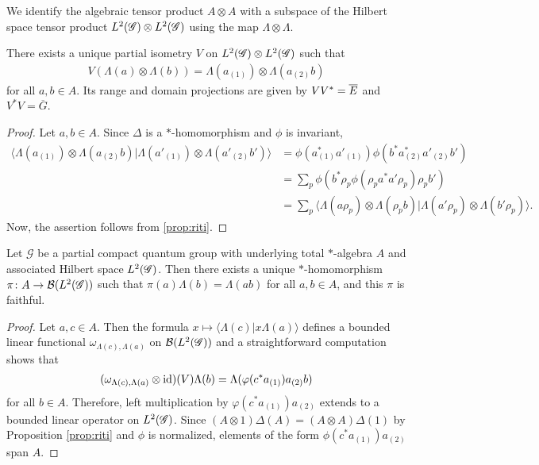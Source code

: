 We identify  the algebraic
tensor product $A\otimes A$ with a subspace of the Hilbert space
tensor product $L^{2}(\mathscr{G}) \otimes L^{2}(\mathscr{G})$ using the map $\Lambda \otimes \Lambda$.
\begin{Lem} \label{lemma:partial-isometry}
There exists a unique partial isometry $V$ on $L^{2}(\mathscr{G}) \otimes L^{2}(\mathscr{G})$
such that
\begin{align*}
  V(\Lambda(a) \otimes \Lambda(b)) = \Lambda(a_{(1)}) \otimes \Lambda(a_{(2)}b)
\end{align*}
for all $a,b\in A$. Its range and domain projections are given by $VV^{*} = \overline{E}$
and $V^{*}V = \overline{G}$.
\end{Lem}
\begin{proof}
  Let $a,b \in A$. Since $\Delta$ is a $*$-homomorphism and $\phi$ is
invariant,
  \begin{align*}
    \langle \Lambda(a_{(1)}) \otimes
    \Lambda(a_{(2)}b)|\Lambda(a'_{(1)}) \otimes
    \Lambda(a'_{(2)}b')\rangle &=
    \phi(a_{(1)}^{*}a'_{(1)})\phi(b^{*}a_{(2)}^{*}a'_{(2)}b') \\
    &= \sum_{p}
    \phi(b^{*}\rho_{p}\phi(\rho_{p}a^{*}a'\rho_{p})\rho_{p}b') \\
    & =\sum_{p} \langle\Lambda(a\rho_{p}) \otimes \Lambda(\rho_{p}b) |
    \Lambda(a'\rho_{p}) \otimes \Lambda(b'\rho_{p})\rangle.
  \end{align*}
  Now, the assertion follows from \ref{prop:riti}.
\end{proof}

\begin{Prop} \label{prop:gns} Let $\mathscr{G}$ be a partial compact quantum group with
  underlying total $*$-algebra $A$ and associated Hilbert
  space $L^{2}(\mathscr{G})$. Then there exists a unique $*$-homomorphism $\pi\colon
  A \to {\cal B}(L^{2}(\mathscr{G}))$ such that $\pi(a)\Lambda(b)=\Lambda(ab)$ for
  all $a,b\in A$, and this $\pi$ is faithful.
\end{Prop}
\begin{proof} 
  Let $a,c \in A$. Then the formula $x \mapsto \langle
\Lambda(c) | x\Lambda(a)\rangle$ defines a bounded linear functional
  $\omega_{\Lambda(c),\Lambda(a)}$ on ${\cal B}(L^{2}(\mathscr{G}))$ and a
  straightforward computation shows that
  \begin{align*}
    (\omega_{\Lambda(c),\Lambda(a)}\otimes \operatorname{id})(V)\Lambda(b) =
    \Lambda(\varphi(c^*a_{(1)})a_{(2)}b)
  \end{align*}
  for all $b\in A$. Therefore, left multiplication by
  $\varphi(c^*a_{(1)})a_{(2)}$ extends to a bounded linear operator on $L^{2}(\mathscr{G})$.
 Since $(A\otimes 1)\Delta(A) = (A\otimes
  A)\Delta(1)$ by Proposition \ref{prop:riti} and $\phi$ is
  normalized,  elements of the form $\phi(c^{*}a_{(1)})a_{(2)}$ span
  $A$. 
\end{proof}


